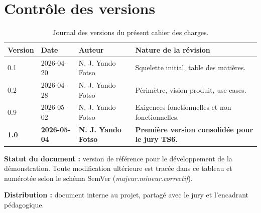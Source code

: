 \chapter*{Contrôle des versions}

\begin{table}[h]
  \centering
  \begin{tabular}{@{}llll@{}}
    \toprule
    \textbf{Version} & \textbf{Date} & \textbf{Auteur} & \textbf{Nature de la révision} \\
    \midrule
    0.1 & 2026-04-20 & N. J. Yando Fotso & Squelette initial, table des matières. \\
    0.2 & 2026-04-28 & N. J. Yando Fotso & Périmètre, vision produit, use cases. \\
    0.9 & 2026-05-02 & N. J. Yando Fotso & Exigences fonctionnelles et non fonctionnelles. \\
    \textbf{1.0} & \textbf{2026-05-04} & \textbf{N. J. Yando Fotso} & \textbf{Première version consolidée pour le jury TS6.} \\
    \bottomrule
  \end{tabular}
  \caption{Journal des versions du présent cahier des charges.}
  \label{tab:cdc-versions}
\end{table}

\noindent\textbf{Statut du document :} version de référence pour le
développement de la démonstration. Toute modification ultérieure est
tracée dans ce tableau et numérotée selon le schéma SemVer
(\textit{majeur.mineur.correctif}).

\noindent\textbf{Distribution :} document interne au projet, partagé
avec le jury et l'encadrant pédagogique.

\clearpage
